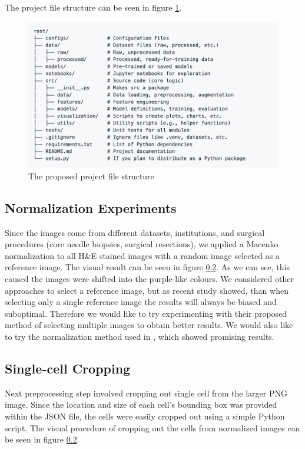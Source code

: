 The project file structure can be seen in figure \ref{fig:project-structure}.

\begin{figure}[H]
    \begin{centering}
    \includegraphics[width=14cm]{assets/images/project-structure.png}
    \par\end{centering}
    \caption{The proposed project file structure}
    \label{fig:project-structure}
\end{figure}

\subsection{Normalization Experiments}
Since the images come from different datasets, institutions, and surgical procedures (core needle biopsies, surgical resections), we applied a Macenko normalization to all H\&E stained images with a random image selected as a reference image. The visual result can be seen in figure \ref{}. As we can see, this caused the images were shifted into the purple-like colours. We considered other approaches to select a reference image, but as recent study \cite{Ivanov2024} showed, than when selecting only a single reference image the results will always be biased and suboptimal. Therefore we would like to try experimenting with their proposed method of selecting multiple images to obtain better results. We would also like to try the normalization method used in \cite{Vahadane2015}, which showed promising results.

\subsection{Single-cell Cropping}
Next preprocessing step involved cropping out single cell from the larger PNG image. Since the location and size of each cell's bounding box was provided within the JSON file, the cells were easily cropped out using a simple Python script. The visual procedure of cropping out the cells from normalized images can be seen in figure \ref{}.

